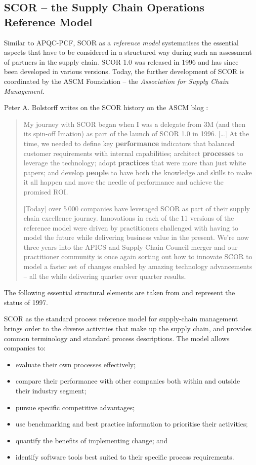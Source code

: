 \documentclass[11pt,a4paper]{article}
\begin{document}
\subsection{SCOR -- the Supply Chain Operations Reference Model}

Similar to APQC-PCF, SCOR as a \emph{reference model} systematises the
essential aspects that have to be considered in a structured way during such
an assessment of partners in the supply chain.  SCOR 1.0 was released in 1996
and has since been developed in various versions. Today, the further
development of SCOR is coordinated by the ASCM Foundation -- the
\emph{Association for Supply Chain Management}.

Peter A. Bolstorff writes on the SCOR history on the ASCM blog
\cite{Bolstorff2017}:
\begin{quote}
  My journey with SCOR began when I was a delegate from 3M (and then its
  spin-off Imation) as part of the launch of SCOR 1.0 in 1996. [\ldots] At the
  time, we needed to define key \textbf{performance} indicators that balanced
  customer requirements with internal capabilities; architect
  \textbf{processes} to leverage the technology; adopt \textbf{practices} that
  were more than just white papers; and develop \textbf{people} to have both
  the knowledge and skills to make it all happen and move the needle of
  performance and achieve the promised ROI.\newpage

  [Today] over 5\,000 companies have leveraged SCOR as part of their supply
  chain excellence journey. Innovations in each of the 11 versions of the
  reference model were driven by practitioners challenged with having to model
  the future while delivering business value in the present. We’re now three
  years into the APICS and Supply Chain Council merger and our practitioner
  community is once again sorting out how to innovate SCOR to model a faster
  set of changes enabled by amazing technology advancements – all the while
  delivering quarter over quarter results.
\end{quote}

The following essential structural elements are taken from \cite{Stewart1997}
and represent the status of 1997.

SCOR as the standard process reference model for supply-chain management
brings order to the diverse activities that make up the supply chain, and
provides common terminology and standard process descriptions. The model
allows companies to:
\begin{itemize}
\item evaluate their own processes effectively;
\item compare their performance with other companies both within and outside
  their industry segment;
\item pursue specific competitive advantages;
\item use benchmarking and best practice information to prioritise their
  activities;
\item quantify the benefits of implementing change; and
\item identify software tools best suited to their specific process
  requirements.
\end{itemize}
\end{document}
